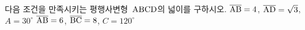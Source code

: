 다음 조건을 만족시키는 평행사변형~$\mathrm{ABCD}$의 넓이를 구하시오.
 $\overline{\mathrm{AB}}=4$, $\overline{\mathrm{AD}}=\sqrt{3}$, $A=30^\circ$
 $\overline{\mathrm{AB}}=6$, $\overline{\mathrm{BC}}=8$, $C=120^\circ$
